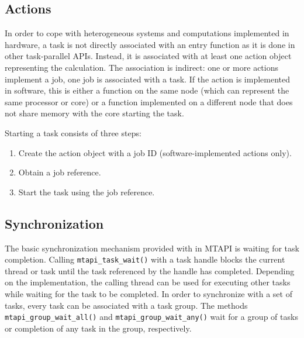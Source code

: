 \subsection{Actions}

In order to cope with heterogeneous systems and computations implemented in hardware, a task is not directly associated with an entry function as it is done in other task-parallel APIs. Instead, it is associated with at least one action object representing the calculation. The association is indirect: one or more actions implement a job, one job is associated with a task. If the action is implemented in software, this is either a function on the same node (which can represent the same processor or core) or a function implemented on a different node that does not share memory with the core starting the task.

Starting a task consists of three steps:
\begin{enumerate}
  \item Create the action object with a job ID (software-implemented actions only).
  \item Obtain a job reference.
  \item Start the task using the job reference.
\end{enumerate}

\subsection{Synchronization}

The basic synchronization mechanism provided with in MTAPI is waiting for task completion. Calling \lstinline|mtapi_task_wait()| with a task handle blocks the current thread or task until the task referenced by the handle has completed. Depending on the implementation, the calling thread can be used for executing other tasks while waiting for the task to be completed. In order to synchronize with a set of tasks, every task can be associated with a task group. The methods \lstinline|mtapi_group_wait_all()| and \lstinline|mtapi_group_wait_any()| wait for a group of tasks or completion of any task in the group, respectively.

